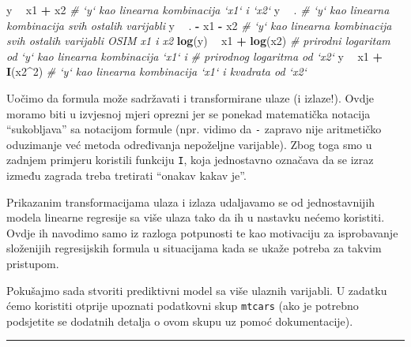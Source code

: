 \documentclass[]{book}
\newenvironment{Shaded}{\begin{snugshade}}{\end{snugshade}}
\newcommand{\KeywordTok}[1]{\textcolor[rgb]{0.13,0.29,0.53}{\textbf{#1}}}
\newcommand{\DecValTok}[1]{\textcolor[rgb]{0.00,0.00,0.81}{#1}}
\newcommand{\StringTok}[1]{\textcolor[rgb]{0.31,0.60,0.02}{#1}}
\newcommand{\CommentTok}[1]{\textcolor[rgb]{0.56,0.35,0.01}{\textit{#1}}}
\newcommand{\OperatorTok}[1]{\textcolor[rgb]{0.81,0.36,0.00}{\textbf{#1}}}
\newcommand{\NormalTok}[1]{#1}
\theoremstyle{definition}
\theoremstyle{definition}
\theoremstyle{definition}
\theoremstyle{remark}
\begin{document}
\begin{Shaded}
\begin{Highlighting}[]
\NormalTok{y }\OperatorTok{~}\StringTok{ }\NormalTok{x1 }\OperatorTok{+}\StringTok{ }\NormalTok{x2              }\CommentTok{# `y` kao linearna kombinacija `x1` i `x2`}
\NormalTok{y }\OperatorTok{~}\StringTok{ }\NormalTok{.                    }\CommentTok{# `y` kao linearna kombinacija svih ostalih varijabli}
\NormalTok{y }\OperatorTok{~}\StringTok{ }\NormalTok{. }\OperatorTok{-}\StringTok{ }\NormalTok{x1 }\OperatorTok{-}\StringTok{ }\NormalTok{x2          }\CommentTok{# `y` kao linearna kombinacija svih ostalih varijabli OSIM x1 i x2}
\KeywordTok{log}\NormalTok{(y)  }\OperatorTok{~}\StringTok{ }\NormalTok{x1 }\OperatorTok{+}\StringTok{ }\KeywordTok{log}\NormalTok{(x2)   }\CommentTok{#  prirodni logaritam od `y` kao linearna kombinacija `x1` i}
                              \CommentTok{# prirodnog logaritma od `x2`}
\NormalTok{y }\OperatorTok{~}\StringTok{ }\NormalTok{x1 }\OperatorTok{+}\StringTok{ }\KeywordTok{I}\NormalTok{(x2}\OperatorTok{^}\DecValTok{2}\NormalTok{)         }\CommentTok{# `y` kao linearna kombinacija `x1` i kvadrata od `x2`}
\end{Highlighting}
\end{Shaded}

Uočimo da formula može sadržavati i transformirane ulaze (i izlaze!).
Ovdje moramo biti u izvjesnoj mjeri oprezni jer se ponekad matematička
notacija ``sukobljava'' sa notacijom formule (npr. vidimo da \texttt{-}
zapravo nije aritmetičko oduzimanje već metoda određivanja nepoželjne
varijable). Zbog toga smo u zadnjem primjeru koristili funkciju
\texttt{I}, koja jednostavno označava da se izraz između zagrada treba
tretirati ``onakav kakav je''.

Prikazanim transformacijama ulaza i izlaza udaljavamo se od
jednostavnijih modela linearne regresije sa više ulaza tako da ih u
nastavku nećemo koristiti. Ovdje ih navodimo samo iz razloga potpunosti
te kao motivaciju za isprobavanje složenijih regresijskih formula u
situacijama kada se ukaže potreba za takvim pristupom.

Pokušajmo sada stvoriti prediktivni model sa više ulaznih varijabli. U
zadatku ćemo koristiti otprije upoznati podatkovni skup \texttt{mtcars}
(ako je potrebno podsjetite se dodatnih detalja o ovom skupu uz pomoć
dokumentacije).

\begin{center}\rule{0.5\linewidth}{\linethickness}\end{center}
\end{document}
